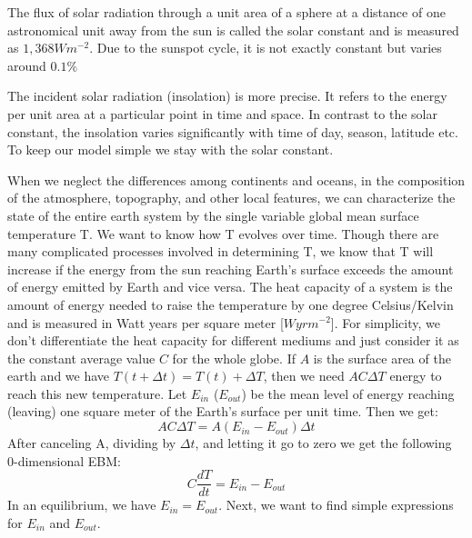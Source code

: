 \documentclass[%
thesis=student,%
coverpage=false,%
titlepage=false,%
headmarks=true, %
english,%
font=libertine, %
math=newpxtx, %
BCOR=5mm,%
coverBCOR=11mm%
]{tumbook}
\begin{document}
The flux of solar radiation through a unit area of a sphere at a distance of one astronomical unit away from the sun is called the solar constant and is measured as $1,368Wm^{-2}$. Due to the sunspot cycle, it is not exactly constant but varies around $0.1\%$

The incident solar radiation (insolation) is more precise. It refers to the energy per unit area at a particular point in time and space. In contrast to the solar constant, the insolation varies significantly with time of day, season, latitude etc. To keep our model simple we stay with the solar constant.

When we neglect the differences among continents and oceans, in the composition of the atmosphere, topography, and other local features, we can characterize the state of the entire earth system by the single variable global mean surface temperature T. We want to know how T evolves over time. Though there are many complicated processes involved in determining T, we know that T will increase if the energy from the sun reaching Earth's surface exceeds the amount of energy emitted by Earth and vice versa.
The heat capacity of a system is the amount of energy needed to raise the temperature by one degree Celsius/Kelvin and is measured in Watt years per square meter [$W yr m^{-2}$]. For simplicity, we don't differentiate the heat capacity for different mediums and just consider it as the constant average value $C$ for the whole globe. If $A$ is the surface area of the earth and we have $T(t+\Delta t) = T(t) + \Delta T$, then we need $AC\Delta T$ energy to reach this new temperature.  Let $E_{in}$  ($E_{out}$) be the mean level of energy reaching (leaving) one square meter of the Earth's surface per unit time. Then we get: 
\begin{equation}
AC\Delta T = A(E_{in} - E_{out})\Delta t
\end{equation}
After canceling A, dividing by $\Delta t$, and letting it go to zero we get the following 0-dimensional EBM: 
\begin{equation}
    C\frac{dT}{dt} = E_{in} - E_{out}
\end{equation}
In an equilibrium, we have $E_{in} = E_{out}$. Next, we want to find simple expressions for $E_{in}$ and $E_{out}$.
\end{document}
